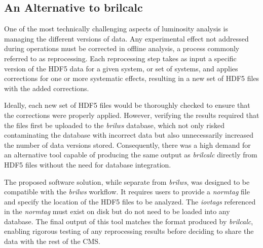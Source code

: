

\subsection{An Alternative to brilcalc}

One of the most technically challenging aspects of luminosity analysis is managing the different versions of data. Any experimental effect not addressed during operations must be corrected in offline analysis, a process commonly referred to as reprocessing. Each reprocessing step takes as input a specific version of the HDF5 data for a given system, or set of systems, and applies corrections for one or more systematic effects, resulting in a new set of HDF5 files with the added corrections.

Ideally, each new set of HDF5 files would be thoroughly checked to ensure that the corrections were properly applied. However, verifying the results required that the files first be uploaded to the \textit{brilws} database, which not only risked contaminating the database with incorrect data but also unnecessarily increased the number of data versions stored. Consequently, there was a high demand for an alternative tool capable of producing the same output as \textit{brilcalc} directly from HDF5 files without the need for database integration.

The proposed software solution, while separate from \textit{brilws}, was designed to be compatible with the \textit{brilws} workflow. It requires users to provide a \textit{normtag} file and specify the location of the HDF5 files to be analyzed. The \textit{iovtags} referenced in the \textit{normtag} must exist on disk but do not need to be loaded into any database. The final output of this tool matches the format produced by \textit{brilcalc}, enabling rigorous testing of any reprocessing results before deciding to share the data with the rest of the CMS.

